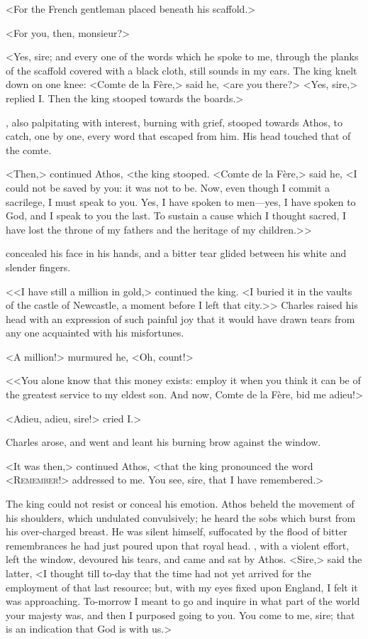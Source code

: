 <For the French gentleman placed beneath his scaffold.>

<For you, then, monsieur?>

<Yes, sire; and every one of the words which he spoke to me, through the planks of the scaffold covered with a black cloth, still sounds in my ears. The king knelt down on one knee: <Comte de la Fère,> said he, <are you there?> <Yes, sire,> replied I\@. Then the king stooped towards the boards.>

, also palpitating with interest, burning with grief, stooped towards Athos, to catch, one by one, every word that escaped from him. His head touched that of the comte.

<Then,> continued Athos, <the king stooped. <Comte de la Fère,> said he, <I could not be saved by you: it was not to be. Now, even though I commit a sacrilege, I must speak to you. Yes, I have spoken to men—yes, I have spoken to God, and I speak to you the last. To sustain a cause which I thought sacred, I have lost the throne of my fathers and the heritage of my children.>>

 concealed his face in his hands, and a bitter tear glided between his white and slender fingers.

<<I have still a million in gold,> continued the king. <I buried it in the vaults of the castle of Newcastle, a moment before I left that city.>> Charles raised his head with an expression of such painful joy that it would have drawn tears from any one acquainted with his misfortunes.

<A million!> murmured he, <Oh, count!>

<<You alone know that this money exists: employ it when you think it can be of the greatest service to my eldest son. And now, Comte de la Fère, bid me adieu!>

<Adieu, adieu, sire!> cried I\@.>

Charles arose, and went and leant his burning brow against the window.

<It was then,> continued Athos, <that the king pronounced the word <\textsc{Remember!}> addressed to me. You see, sire, that I have remembered.>

The king could not resist or conceal his emotion. Athos beheld the movement of his shoulders, which undulated convulsively; he heard the sobs which burst from his over-charged breast. He was silent himself, suffocated by the flood of bitter remembrances he had just poured upon that royal head. , with a violent effort, left the window, devoured his tears, and came and sat by Athos. <Sire,> said the latter, <I thought till to-day that the time had not yet arrived for the employment of that last resource; but, with my eyes fixed upon England, I felt it was approaching. To-morrow I meant to go and inquire in what part of the world your majesty was, and then I purposed going to you. You come to me, sire; that is an indication that God is with us.>

